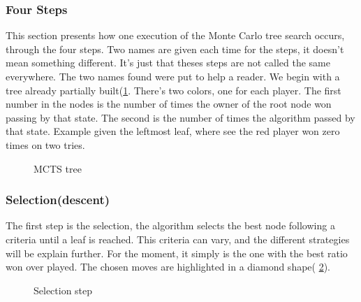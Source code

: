 \subsubsection{Four Steps}
This section presents how one execution of the Monte Carlo tree search occurs, through the four steps. Two names are given each time for the steps, it doesn't mean something different. It's just that theses steps are not called the same everywhere. The two names found were put to help a reader. We begin with a tree already partially built(\ref{Tree}. There's two colors, one for each player. The first number in the nodes is the number of times the owner of the root node won passing by that state. The second is the number of times the algorithm passed by that state. Example given the leftmost leaf, where see the red player won zero times on two tries. 
\begin{figure}
\begin{center}
\end{center}
\caption{MCTS tree}
\label{Tree}
\end{figure}
\subsubsection{Selection(descent)}
The first step is the selection, the algorithm selects the best node following a criteria until a leaf is reached. This criteria can vary, and the different strategies will be explain further. For the moment, it simply is the one with the best ratio won over played. The chosen moves are highlighted in a diamond shape( \ref{Selec}). 
\begin{figure}
\begin{center}
\end{center}
\caption{Selection step}
\label{Selec}
\end{figure}
